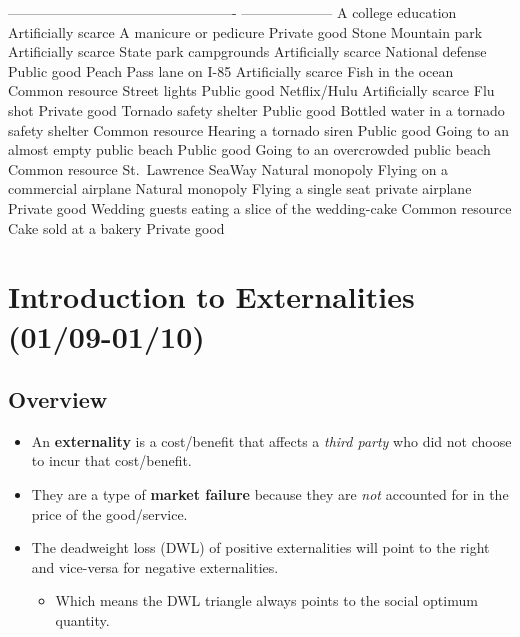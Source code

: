 \documentclass[
  letterpaper,
  DIV=11,
  numbers=noendperiod]{scrartcl}
\providecommand{\tightlist}{%
  \setlength{\itemsep}{0pt}\setlength{\parskip}{0pt}}\usepackage{longtable,booktabs,array}
\begin{document}
------------------------------------------------- \textbar{}
-------------------- A college education \textbar{} Artificially scarce
A manicure or pedicure \textbar{} Private good Stone Mountain park
\textbar{} Artificially scarce State park campgrounds \textbar{}
Artificially scarce National defense \textbar{} Public good Peach Pass
lane on I-85 \textbar{} Artificially scarce Fish in the ocean \textbar{}
Common resource Street lights \textbar{} Public good Netflix/Hulu
\textbar{} Artificially scarce Flu shot \textbar{} Private good Tornado
safety shelter \textbar{} Public good Bottled water in a tornado safety
shelter \textbar{} Common resource Hearing a tornado siren \textbar{}
Public good Going to an almost empty public beach \textbar{} Public good
Going to an overcrowded public beach \textbar{} Common resource
St.~Lawrence SeaWay \textbar{} Natural monopoly Flying on a commercial
airplane \textbar{} Natural monopoly Flying a single seat private
airplane \textbar{} Private good Wedding guests eating a slice of the
wedding-cake \textbar{} Common resource Cake sold at a bakery \textbar{}
Private good

\newpage{}

\hypertarget{introduction-to-externalities-0109-0110}{%
\section{Introduction to Externalities
(01/09-01/10)}\label{introduction-to-externalities-0109-0110}}

\hypertarget{overview}{%
\subsection{Overview}\label{overview}}

\begin{itemize}
\tightlist
\item
  An \textbf{externality} is a cost/benefit that affects a \emph{third
  party} who did not choose to incur that cost/benefit.
\item
  They are a type of \textbf{market failure} because they are \emph{not}
  accounted for in the price of the good/service.
\item
  The deadweight loss (DWL) of positive externalities will point to the
  right and vice-versa for negative externalities.

  \begin{itemize}
  \tightlist
  \item
    Which means the DWL triangle always points to the social optimum
    quantity.
  \end{itemize}
\end{itemize}
\end{document}
